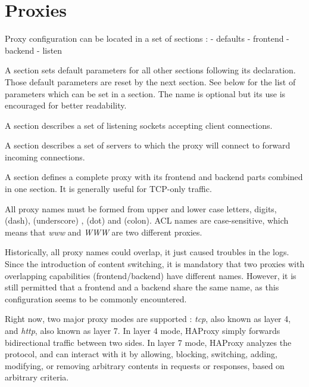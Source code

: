 
\chapter{Proxies}

Proxy configuration can be located in a set of sections :
 - defaults 
 - frontend 
 - backend  
 - listen   


A  section sets default parameters for all other sections following
its declaration. Those default parameters are reset by the next 
section. See below for the list of parameters which can be set in a 
section. The name is optional but its use is encouraged for better readability.


A  section describes a set of listening sockets accepting client
connections.


A  section describes a set of servers to which the proxy will connect
to forward incoming connections.


A  section defines a complete proxy with its frontend and backend
parts combined in one section. It is generally useful for TCP-only traffic.


All proxy names must be formed from upper and lower case letters, digits,
\CHAR{-} (dash), \CHAR{\_} (underscore) ,  (dot) and \CHAR{:} (colon). ACL names are
case-sensitive, which means that \emph{www} and \emph{WWW} are two different proxies.


Historically, all proxy names could overlap, it just caused troubles in the
logs. Since the introduction of content switching, it is mandatory that two
proxies with overlapping capabilities (frontend/backend) have different names.
However, it is still permitted that a frontend and a backend share the same
name, as this configuration seems to be commonly encountered.


Right now, two major proxy modes are supported : \emph{tcp}, also known as layer 4,
and \emph{http}, also known as layer 7. In layer 4 mode, HAProxy simply forwards
bidirectional traffic between two sides. In layer 7 mode, HAProxy analyzes the
protocol, and can interact with it by allowing, blocking, switching, adding,
modifying, or removing arbitrary contents in requests or responses, based on
arbitrary criteria.

